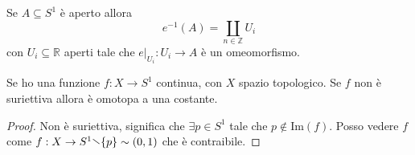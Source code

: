 \begin{lemma}\label{lem:unif_rivest}
    Se \(A \subseteq S^{1} \) è aperto allora
    \[
      e^{-1}{(A)} = \coprod_{n \in \mathbb{Z}} U_{i}
    \]
    con \(U_{i} \subseteq \mathbb{R} \) aperti tale che \(e|_{U_{i}} : U_{i} \to
    A\) è un omeomorfismo. 
\end{lemma}
\begin{corollary}
    Se ho una funzione \(f: X \to S^{1}\) continua, con \(X\) spazio topologico.
    Se \(f\) non è suriettiva allora è omotopa a una costante.
\end{corollary}
\begin{proof}
    Non è suriettiva, significa che \(\exists p \in S^{1}\) tale che \(p \not\in
    \mathrm{Im}{(f)}\). Posso vedere \(f\)  come \(f: X \to S^{1} \sminus \{p\}
    \sim (0, 1)\) che è contraibile.
\end{proof}







